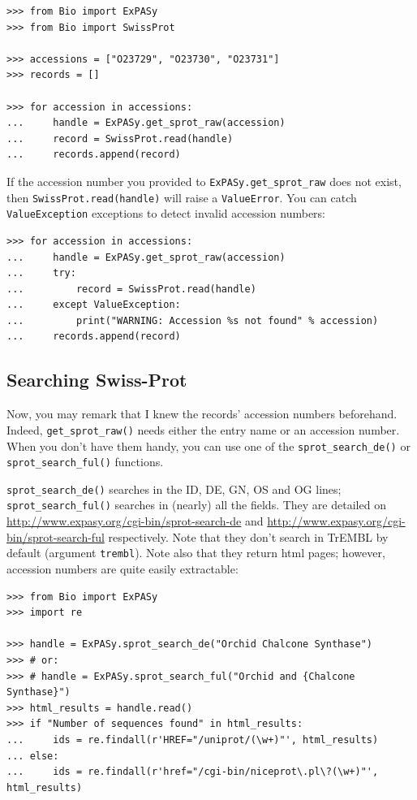 \documentclass{report}
\begin{document}
\begin{verbatim}
>>> from Bio import ExPASy
>>> from Bio import SwissProt

>>> accessions = ["O23729", "O23730", "O23731"]
>>> records = []

>>> for accession in accessions:
...     handle = ExPASy.get_sprot_raw(accession)
...     record = SwissProt.read(handle)
...     records.append(record)
\end{verbatim}

If the accession number you provided to \verb|ExPASy.get_sprot_raw| does not exist, then \verb|SwissProt.read(handle)| will raise a \verb|ValueError|. You can catch \verb|ValueException| exceptions to detect invalid accession numbers:

\begin{verbatim}
>>> for accession in accessions:
...     handle = ExPASy.get_sprot_raw(accession)
...     try:
...         record = SwissProt.read(handle)
...     except ValueException:
...         print("WARNING: Accession %s not found" % accession)
...     records.append(record)
\end{verbatim}

\subsection{Searching Swiss-Prot}

Now, you may remark that I knew the records' accession numbers
beforehand. Indeed, \verb|get_sprot_raw()| needs either the entry name
or an accession number. When you don't have them handy, you can use
one of the \verb|sprot_search_de()| or \verb|sprot_search_ful()|
functions.

\verb|sprot_search_de()| searches in the ID, DE, GN, OS and OG lines;
\verb|sprot_search_ful()| searches in (nearly) all the fields. They
are detailed on
\url{http://www.expasy.org/cgi-bin/sprot-search-de} and
\url{http://www.expasy.org/cgi-bin/sprot-search-ful}
respectively. Note that they don't search in TrEMBL by default
(argument \verb|trembl|). Note also that they return html pages;
however, accession numbers are quite easily extractable:

\begin{verbatim}
>>> from Bio import ExPASy
>>> import re

>>> handle = ExPASy.sprot_search_de("Orchid Chalcone Synthase")
>>> # or:
>>> # handle = ExPASy.sprot_search_ful("Orchid and {Chalcone Synthase}")
>>> html_results = handle.read()
>>> if "Number of sequences found" in html_results:
...     ids = re.findall(r'HREF="/uniprot/(\w+)"', html_results)
... else:
...     ids = re.findall(r'href="/cgi-bin/niceprot\.pl\?(\w+)"', html_results)
\end{verbatim}
\end{document}
